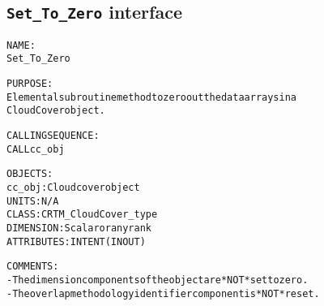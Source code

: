 \subsection{\texttt{Set\_To\_Zero} interface}
  \label{sec:Set_To_Zero_interface}
  \begin{alltt}
 
  NAME:
    Set_To_Zero
 
  PURPOSE:
    Elemental subroutine method to zero out the data arrays in a
    CloudCover object.
 
  CALLING SEQUENCE:
    CALL cc_obj%Set_To_Zero()
 
  OBJECTS:
    cc_obj:  Cloud cover object
             UNITS:      N/A
             CLASS:      CRTM_CloudCover_type
             DIMENSION:  Scalar or any rank
             ATTRIBUTES: INTENT(IN OUT)
 
  COMMENTS:
    - The dimension components of the object are *NOT* set to zero.
    - The overlap methodology identifier component is *NOT* reset.
 
  \end{alltt}

